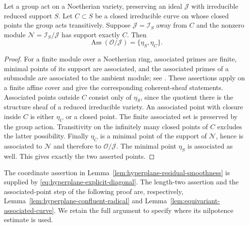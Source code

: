 \begin{lemma}
\label{lem:equivariant-associated-curve}
Let a group act on a Noetherian variety, preserving an ideal
$\mathcal J$ with irreducible reduced support $S$. Let $C\subset S$
be a closed irreducible curve on whose closed points the group acts
transitively. Suppose $\mathcal J=\mathcal I_S$ away from $C$
and the nonzero module $\mathcal N=\mathcal I_S/\mathcal J$
has support exactly $C$. Then
\[
       \operatorname{Ass}(\mathcal O/\mathcal J)
                     =\{\eta_S,\eta_C\}.
\]
\end{lemma}
\begin{proof}
For a finite module over a Noetherian ring, associated primes are
finite, minimal points of its support are associated, and the
associated primes of a submodule are associated to the ambient
module; see \cite[Lemma 10.63.3, Lemma 10.63.5,
and Proposition 10.63.6]{StacksAssociated}. These assertions apply
on a finite affine cover and give the corresponding coherent-sheaf
statements. Associated points outside $C$ consist only of $\eta_S$,
since the quotient there is the structure sheaf of a reduced
irreducible variety. An associated point with closure inside $C$
is either $\eta_C$ or a closed point. The finite associated set is
preserved by the group action. Transitivity on the infinitely many
closed points of $C$ excludes the latter possibility. Finally
$\eta_C$ is a minimal point of the support of $\mathcal N$, hence
is associated to $\mathcal N$ and therefore to
$\mathcal O/\mathcal J$. The minimal point $\eta_S$ is associated
as well. This gives exactly the two asserted points.
\end{proof}

The coordinate assertion in
Lemma~\ref{lem:hyperplane-residual-smoothness} is supplied by
\eqref{eq:hyperplane-explicit-diagonal}. The length-two assertion
and the associated-point step of the following proof are, respectively,
Lemma~\ref{lem:hyperplane-confluent-radical} and
Lemma~\ref{lem:equivariant-associated-curve}. We retain the full
argument to specify where its nilpotence estimate is used.


